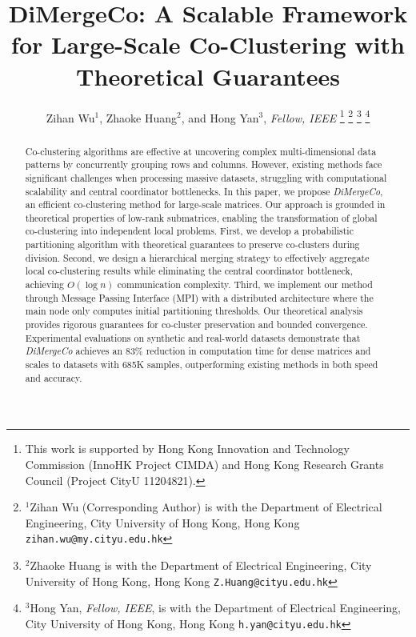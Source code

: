 \documentclass[journal]{IEEEtran}
\begin{document}
\title{\LARGE \bf DiMergeCo: A Scalable Framework for Large-Scale Co-Clustering with Theoretical Guarantees}


\author{Zihan Wu$^{1}$, Zhaoke Huang$^{2}$, and Hong Yan$^{3}$, \textit{Fellow, IEEE}%
    \thanks{This work is supported by Hong Kong Innovation and
        Technology Commission (InnoHK Project CIMDA) and Hong
        Kong Research Grants Council (Project CityU 11204821).}%
    \thanks{$^{1}$Zihan Wu (Corresponding Author) is with the Department of Electrical Engineering,
        City University of Hong Kong, Hong Kong
            {\tt\small zihan.wu@my.cityu.edu.hk}}%
    \thanks{$^{2}$Zhaoke Huang is with the Department of Electrical Engineering,
        City University of Hong Kong, Hong Kong
            {\tt\small Z.Huang@cityu.edu.hk}}%
    \thanks{$^{3}$Hong Yan, \textit{Fellow, IEEE}, is with the Department of Electrical Engineering,
        City University of Hong Kong, Hong Kong
            {\tt\small h.yan@cityu.edu.hk}}%
}
\maketitle

\begin{abstract}
    Co-clustering algorithms are effective at uncovering complex multi-dimensional data patterns by concurrently grouping rows and columns. However, existing methods face significant challenges when processing massive datasets, struggling with computational scalability and central coordinator bottlenecks. In this paper, we propose \emph{DiMergeCo}, an efficient co-clustering method for large-scale matrices. Our approach is grounded in theoretical properties of low-rank submatrices, enabling the transformation of global co-clustering into independent local problems.  First, we develop a probabilistic partitioning algorithm with theoretical guarantees to preserve co-clusters during division. Second, we design a hierarchical merging strategy to effectively aggregate local co-clustering results while eliminating the central coordinator bottleneck, achieving $O(\log n)$ communication complexity. Third, we implement our method through Message Passing Interface (MPI) with a distributed architecture where the main node only computes initial partitioning thresholds.
    Our theoretical analysis provides rigorous guarantees for co-cluster preservation and bounded convergence. Experimental evaluations on synthetic and real-world datasets demonstrate that \emph{DiMergeCo} achieves an 83\% reduction in computation time for dense matrices and scales to datasets with 685K samples, outperforming existing methods in both speed and accuracy.
\end{abstract}
\end{document}
